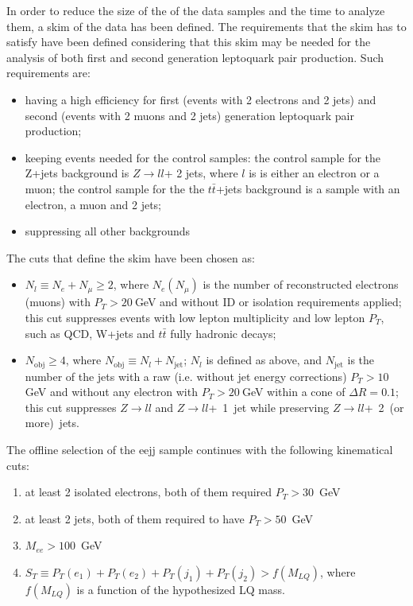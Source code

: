 In order to reduce the size of the of the data samples and the time to analyze them, a skim of the 
data has been defined.
The requirements that the skim has to satisfy have been defined considering that this skim may be needed
for the analysis of both first and second generation leptoquark pair production. Such requirements are:
\begin{itemize}
\item having a high efficiency for first (events with 2 electrons and 2 jets) and second (events with 
2 muons and 2 jets) generation leptoquark pair production; 
\item keeping events needed for the control samples: the control sample for the Z+jets background is $Z\rightarrow l l$+ 2 jets,
where $l$ is is either an electron or a muon; the control sample for the the $t\bar{t}$+jets background is a sample 
with an electron, a muon and 2 jets;
\item suppressing all other backgrounds
\end{itemize}
The cuts that define the skim have been chosen as:
\begin{itemize}
\item $N_l \equiv N_e + N_{\mu} \ge 2$, where $N_e (N_{\mu})$ is the number of reconstructed electrons (muons)
with $P_T>20~$GeV and without ID or isolation requirements applied; this cut suppresses events with low 
lepton multiplicity and low lepton $P_T$, such as QCD, W+jets and $t\bar{t}$ fully hadronic decays;
\item $N_{\mathrm{obj}} \ge 4$, where $N_{\mathrm{obj}} \equiv N_l + N_{\mathrm{jet}}$; $N_l$ is defined as above, and
$N_{\mathrm{jet}}$ is the number of the jets with a raw (i.e. without jet energy corrections) $P_T > 10~$GeV and without 
any electron with $P_T > 20~$GeV within a cone of $\Delta R=0.1$; this cut suppresses $Z \rightarrow ll$ and 
$Z \rightarrow ll$+~1~jet while preserving $Z \rightarrow ll$+~2~(or more)~jets.
\end{itemize}

The offline selection of the eejj sample continues with the following kinematical cuts:
%
\begin{enumerate}
\item at least 2 isolated electrons, both of them required $P_T>30$~GeV 
\item at least 2 jets, both of them required to have $P_T>50$~GeV
\item $M_{ee}>100$~GeV
\item $S_T\equiv P_T(e_1)+P_T(e_2)+P_T(j_1)+P_T(j_2)>f(M_{LQ})$, where $f(M_{LQ})$ is a function 
of the hypothesized LQ mass.
\end{enumerate}
%

